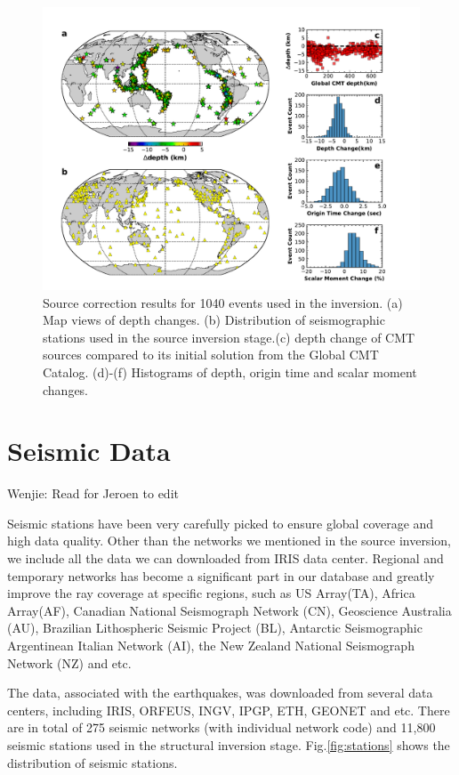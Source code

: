 \documentclass[extra,mreferee]{gji}
\begin{document}
\begin{figure}
  \centering
  \includegraphics[width=\textwidth]{figures/source_corrections.pdf}
  \caption{Source correction results for 1040 events used in the inversion. (a) Map views of depth changes. (b) Distribution of seismographic stations used in the source inversion stage.(c) depth change of CMT sources compared to its initial solution from the Global CMT Catalog. (d)-(f) Histograms of depth, origin time and scalar moment changes.}
  \label{fig:source_correction}
\end{figure}

\section{Seismic Data}

{\color{Red} Wenjie: Read for Jeroen to edit}

Seismic stations have been very carefully picked to ensure global coverage and high data quality.
Other than the networks we mentioned in the source inversion, we include all the data we can
downloaded from IRIS data center. Regional and temporary networks has become a significant part
in our database and greatly improve the ray coverage at specific regions, such as US Array(TA),
Africa Array(AF), Canadian National Seismograph Network (CN), Geoscience Australia (AU),
Brazilian Lithospheric Seismic Project (BL),
Antarctic Seismographic Argentinean Italian Network (AI),
the New Zealand National Seismograph Network (NZ) and etc.

The data, associated with the earthquakes, was downloaded from several data centers,
including IRIS, ORFEUS, INGV, IPGP, ETH, GEONET and etc.
There are in total of 275 seismic networks (with individual network code) and 11,800
seismic stations used in the structural inversion stage. Fig.\ref{fig:stations}
shows the distribution of seismic stations.
\end{document}
